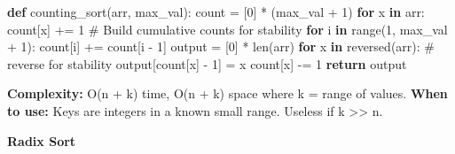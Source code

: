 \documentclass[11pt]{article}
\newenvironment{Shaded}{\begin{snugshade}}{\end{snugshade}}
\newcommand{\BuiltInTok}[1]{\textcolor[rgb]{0.50,0.55,0.55}{#1}}
\newcommand{\CommentTok}[1]{\textcolor[rgb]{0.48,0.49,0.49}{#1}}
\newcommand{\ControlFlowTok}[1]{\textcolor[rgb]{0.99,0.74,0.29}{\textbf{#1}}}
\newcommand{\DecValTok}[1]{\textcolor[rgb]{0.96,0.45,0.00}{#1}}
\newcommand{\KeywordTok}[1]{\textcolor[rgb]{0.81,0.81,0.76}{\textbf{#1}}}
\newcommand{\NormalTok}[1]{\textcolor[rgb]{0.81,0.81,0.76}{#1}}
\newcommand{\OperatorTok}[1]{\textcolor[rgb]{0.81,0.81,0.76}{#1}}
\begin{document}
\begin{Shaded}
\begin{Highlighting}[]
\KeywordTok{def}\NormalTok{ counting\_sort(arr, max\_val):}
\NormalTok{    count }\OperatorTok{=}\NormalTok{ [}\DecValTok{0}\NormalTok{] }\OperatorTok{*}\NormalTok{ (max\_val }\OperatorTok{+} \DecValTok{1}\NormalTok{)}
    \ControlFlowTok{for}\NormalTok{ x }\KeywordTok{in}\NormalTok{ arr:}
\NormalTok{        count[x] }\OperatorTok{+=} \DecValTok{1}
    \CommentTok{\# Build cumulative counts for stability}
    \ControlFlowTok{for}\NormalTok{ i }\KeywordTok{in} \BuiltInTok{range}\NormalTok{(}\DecValTok{1}\NormalTok{, max\_val }\OperatorTok{+} \DecValTok{1}\NormalTok{):}
\NormalTok{        count[i] }\OperatorTok{+=}\NormalTok{ count[i }\OperatorTok{{-}} \DecValTok{1}\NormalTok{]}
\NormalTok{    output }\OperatorTok{=}\NormalTok{ [}\DecValTok{0}\NormalTok{] }\OperatorTok{*} \BuiltInTok{len}\NormalTok{(arr)}
    \ControlFlowTok{for}\NormalTok{ x }\KeywordTok{in} \BuiltInTok{reversed}\NormalTok{(arr):     }\CommentTok{\# reverse for stability}
\NormalTok{        output[count[x] }\OperatorTok{{-}} \DecValTok{1}\NormalTok{] }\OperatorTok{=}\NormalTok{ x}
\NormalTok{        count[x] }\OperatorTok{{-}=} \DecValTok{1}
    \ControlFlowTok{return}\NormalTok{ output}
\end{Highlighting}
\end{Shaded}

\textbf{Complexity:} O(n + k) time, O(n + k) space where k = range of values.
\textbf{When to use:} Keys are integers in a known small range. Useless if k \textgreater\textgreater{} n.

\textbf{Radix Sort}

\end{document}

